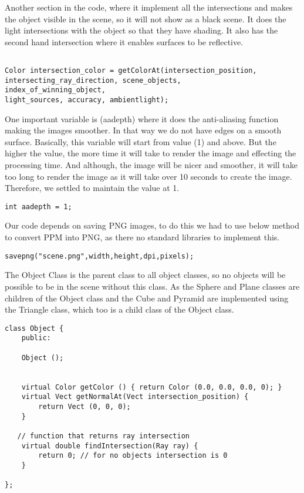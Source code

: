 \documentclass{article}
\begin{document}
Another section in the code, where it implement all the intersections and makes the object visible in the scene, so it will not show as a black scene.  It does the light intersections with the object so that they have shading. It also has the second hand intersection where it enables surfaces to be reflective.  
\begin{lstlisting}

Color intersection_color = getColorAt(intersection_position,
intersecting_ray_direction, scene_objects,
index_of_winning_object,
light_sources, accuracy, ambientlight); \end{lstlisting}

One important variable is (aadepth) where it does the anti-aliasing function making the images smoother. In that way we do not have edges on a smooth surface.  Basically, this variable will start from value (1) and above. But the higher the value, the more time it will take to render the image and effecting the processing time. And although, the image will be nicer and smoother, it will take too long to render the image as it will take over 10 seconds to create the image.  Therefore, we settled to maintain the value at 1.
\begin{lstlisting}
int aadepth = 1;
\end{lstlisting}

Our code depends on saving PNG images, to do this we had to use below method to convert PPM into PNG, as there no standard libraries to implement this. 
\begin{lstlisting}
savepng("scene.png",width,height,dpi,pixels);
\end{lstlisting}


The Object Class is the parent class to all object classes, so no objects will be possible to be in the scene without this class. As the Sphere and Plane classes are children of the Object class and the Cube and Pyramid are implemented using the Triangle class, which too is a child class of the Object class.

\begin{lstlisting}
class Object {
    public: 

    Object (); 

    
    virtual Color getColor () { return Color (0.0, 0.0, 0.0, 0); } 
    virtual Vect getNormalAt(Vect intersection_position) {
        return Vect (0, 0, 0);
    }

   // function that returns ray intersection
    virtual double findIntersection(Ray ray) {
        return 0; // for no objects intersection is 0
    }

};

\end{lstlisting}
 \newpage
\end{document}
